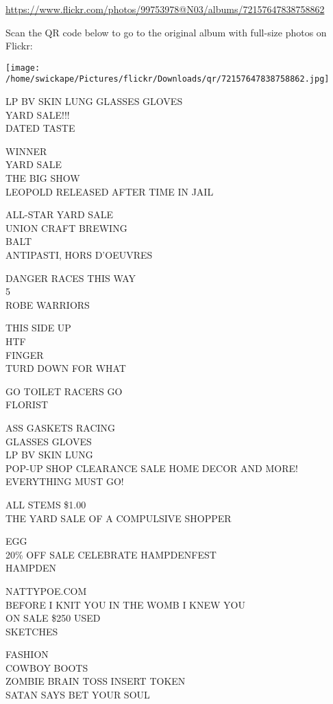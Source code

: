 \documentclass[10pt,letterpaper]{article}
\begin{document}
\url{https://www.flickr.com/photos/99753978@N03/albums/72157647838758862}

Scan the QR code below to go to the original album with full-size photos on Flickr:

\texttt{[image: /home/swickape/Pictures/flickr/Downloads/qr/72157647838758862.jpg]}
\pagebreak

LP BV SKIN LUNG GLASSES GLOVES\\
YARD SALE!!!\\
DATED TASTE

WINNER\\
YARD SALE\\
THE BIG SHOW\\
LEOPOLD RELEASED AFTER TIME IN JAIL

ALL{-}STAR YARD SALE\\
UNION CRAFT BREWING\\
BALT\\
ANTIPASTI, HORS D'OEUVRES

DANGER RACES THIS WAY\\
5\\
ROBE WARRIORS

THIS SIDE UP\\
HTF\\
FINGER\\
TURD DOWN FOR WHAT

GO TOILET RACERS GO\\
FLORIST

ASS GASKETS RACING\\
GLASSES GLOVES\\
LP BV SKIN LUNG\\
POP{-}UP SHOP CLEARANCE SALE HOME DECOR AND MORE! EVERYTHING MUST GO!

ALL STEMS \$1.00\\
THE YARD SALE OF A COMPULSIVE SHOPPER

EGG\\
20\% OFF SALE CELEBRATE HAMPDENFEST\\
HAMPDEN

NATTYPOE.COM\\
BEFORE I KNIT YOU IN THE WOMB I KNEW YOU\\
ON SALE \$250 USED\\
SKETCHES

FASHION\\
COWBOY BOOTS\\
ZOMBIE BRAIN TOSS INSERT TOKEN\\
SATAN SAYS BET YOUR SOUL
\end{document}
